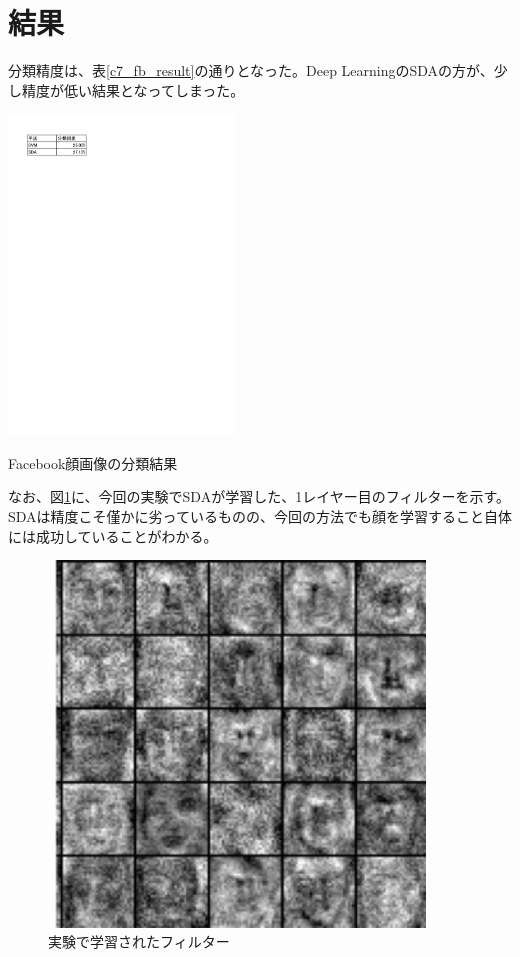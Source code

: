 \section{結果}
分類精度は、表\ref{c7_fb_result}の通りとなった。Deep LearningのSDAの方が、少し精度が低い結果となってしまった。\par
\begin{table}[tbp]
 \begin{center}
  \includegraphics[width=60mm]{img/c7/fb_result}
 \end{center}
 \caption{Facebook顔画像の分類結果}
 \label{c7_fb_result}
\end{table}
なお、図\ref{c7_filter}に、今回の実験でSDAが学習した、1レイヤー目のフィルターを示す。SDAは精度こそ僅かに劣っているものの、今回の方法でも顔を学習すること自体には成功していることがわかる。

\begin{figure}[tbp]
 \begin{center}
  \includegraphics[width=100mm]{img/c7/filter}
 \end{center}
 \caption{実験で学習されたフィルター}
 \label{c7_filter}
\end{figure}

